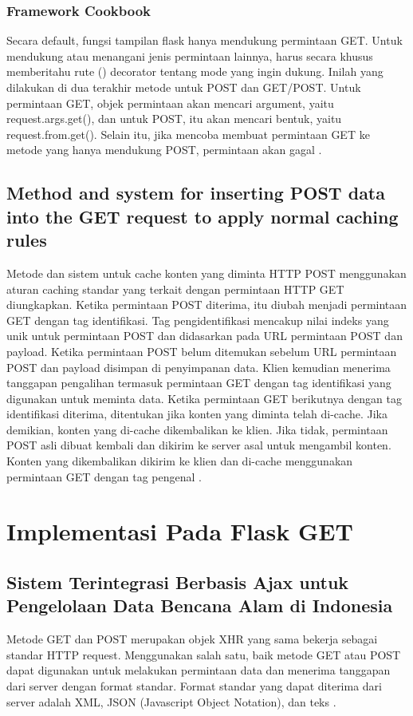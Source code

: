 \subsubsection{Framework Cookbook}
Secara default, fungsi tampilan flask hanya mendukung permintaan GET. Untuk mendukung atau menangani jenis permintaan lainnya, harus secara khusus memberitahu rute () decorator tentang mode yang ingin dukung. Inilah yang dilakukan di dua terakhir metode untuk POST dan GET/POST. Untuk permintaan GET, objek permintaan akan mencari argument, yaitu request.args.get(), dan untuk POST, itu akan mencari bentuk, yaitu request.from.get(). Selain itu, jika mencoba membuat permintaan GET ke metode yang hanya mendukung POST, permintaan akan gagal \cite{aggarwal2014flask}.
\subsection{Method and system for inserting POST data into the GET request to apply normal caching rules}
Metode dan sistem untuk cache konten yang diminta HTTP POST menggunakan aturan caching standar yang terkait dengan permintaan HTTP GET diungkapkan. Ketika permintaan POST diterima, itu diubah menjadi permintaan GET dengan tag identifikasi. Tag pengidentifikasi mencakup nilai indeks yang unik untuk permintaan POST dan didasarkan pada URL permintaan POST dan payload. Ketika permintaan POST belum ditemukan sebelum URL permintaan POST dan payload disimpan di penyimpanan data. Klien kemudian menerima tanggapan pengalihan termasuk permintaan GET dengan tag identifikasi yang digunakan untuk meminta data. Ketika permintaan GET berikutnya dengan tag identifikasi diterima, ditentukan jika konten yang diminta telah di-cache. Jika demikian, konten yang di-cache dikembalikan ke klien. Jika tidak, permintaan POST asli dibuat kembali dan dikirim ke server asal untuk mengambil konten. Konten yang dikembalikan dikirim ke klien dan di-cache menggunakan permintaan GET dengan tag pengenal \cite{sloat2009method}. 

\section{Implementasi Pada Flask GET}
\subsection{Sistem Terintegrasi Berbasis Ajax untuk Pengelolaan Data Bencana Alam di Indonesia}
Metode GET dan POST merupakan objek XHR yang sama bekerja sebagai standar HTTP request. Menggunakan salah satu, baik metode GET atau POST dapat digunakan untuk melakukan permintaan data dan menerima tanggapan dari server dengan format standar. Format standar yang dapat diterima dari server adalah XML, JSON (Javascript Object Notation), dan teks \cite{prasetyo2007sistem}.
